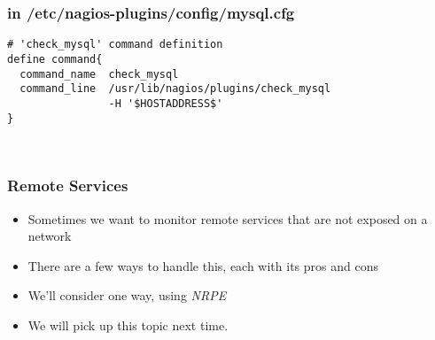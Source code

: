 \documentclass[10pt]{beamer}
\begin{document}
\begin{frame}[fragile]
  \frametitle{in /etc/nagios-plugins/config/mysql.cfg}

\begin{Verbatim}[commandchars=\\\[\]]
# 'check_mysql' command definition
define command{
  command_name  check_mysql
  command_line  /usr/lib/nagios/plugins/check_mysql
                -H '$HOSTADDRESS$' 
}



\end{Verbatim}
\end{frame}


\begin{frame}
  \frametitle{Remote Services}


\begin{itemize}
  \item Sometimes we want to monitor remote services that are not exposed on a network
  \item There are a few ways to handle this, each with its pros and cons
  \item We'll consider one way, using \emph{NRPE}
  \item We will pick up this topic next time.
\end{itemize}

\end{frame}
\end{document}
